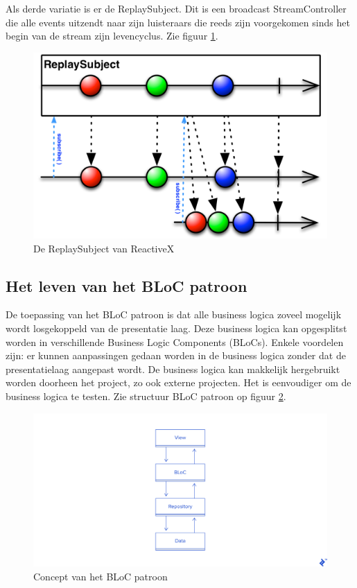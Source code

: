 Als derde variatie is er de ReplaySubject. Dit is een broadcast StreamController die alle events uitzendt naar zijn luisteraars die reeds zijn voorgekomen sinds het begin van de stream zijn levencyclus. Zie figuur \ref{fig:rxdart-replaysubject}.

\begin{figure}[H]
    \centering
    \includegraphics[width=\figureWidthModifier\linewidth]{img/stand-van-zaken/rxdart-replaysubject.png}
    \caption{De ReplaySubject van ReactiveX \autocite{Boelens2018}}
    \label{fig:rxdart-replaysubject}
\end{figure}

\subsection*{Het leven van het BLoC patroon}
De toepassing van het BLoC patroon is dat alle business logica zoveel mogelijk wordt losgekoppeld van de presentatie laag. Deze business logica kan opgesplitst worden in verschillende Business Logic Components (BLoCs). Enkele voordelen zijn: er kunnen aanpassingen gedaan worden in de business logica zonder dat de presentatielaag aangepast wordt. De business logica kan makkelijk hergebruikt worden doorheen het project, zo ook externe projecten. Het is eenvoudiger om de business logica te testen. Zie structuur BLoC patroon op figuur \ref{fig:bloc-pattern}.

\begin{figure}[H]
    \centering
    \includegraphics[width=\figureWidthModifier\linewidth]{img/stand-van-zaken/bloc-pattern.png}
    \caption{Concept van het BLoC patroon \autocite{Perutovic2018}}
    \label{fig:bloc-pattern}
\end{figure}

